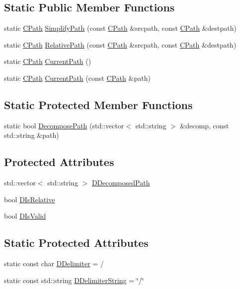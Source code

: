 \subsection*{Static Public Member Functions}
\begin{DoxyCompactItemize}
\item 
static \hyperlink{classCPath}{C\+Path} \hyperlink{classCPath_af0213a2ea0de0498ded236137e759922}{Simplify\+Path} (const \hyperlink{classCPath}{C\+Path} \&srcpath, const \hyperlink{classCPath}{C\+Path} \&destpath)
\item 
static \hyperlink{classCPath}{C\+Path} \hyperlink{classCPath_a76f73670ecc0a434c2f8a1ea0f1a040e}{Relative\+Path} (const \hyperlink{classCPath}{C\+Path} \&srcpath, const \hyperlink{classCPath}{C\+Path} \&destpath)
\item 
static \hyperlink{classCPath}{C\+Path} \hyperlink{classCPath_a5161b834e754b217ddead2437eaaa223}{Current\+Path} ()
\item 
static \hyperlink{classCPath}{C\+Path} \hyperlink{classCPath_a87ec01e5af0eb4e2184caf1d9ecc8892}{Current\+Path} (const \hyperlink{classCPath}{C\+Path} \&path)
\end{DoxyCompactItemize}
\subsection*{Static Protected Member Functions}
\begin{DoxyCompactItemize}
\item 
static bool \hyperlink{classCPath_aae05f3c3502e92bf68d5ce71264c7bb9}{Decompose\+Path} (std\+::vector$<$ std\+::string $>$ \&decomp, const std\+::string \&path)
\end{DoxyCompactItemize}
\subsection*{Protected Attributes}
\begin{DoxyCompactItemize}
\item 
std\+::vector$<$ std\+::string $>$ \hyperlink{classCPath_a03ed25209a01e633c107a0c877fc61f8}{D\+Decomposed\+Path}
\item 
bool \hyperlink{classCPath_af705ff149bb2281c67afb84fff550eb9}{D\+Is\+Relative}
\item 
bool \hyperlink{classCPath_a992aca27a1cba1c3bae3d04438821192}{D\+Is\+Valid}
\end{DoxyCompactItemize}
\subsection*{Static Protected Attributes}
\begin{DoxyCompactItemize}
\item 
static const char \hyperlink{classCPath_a4af2d74fc7695c4de8900dcc426530b5}{D\+Delimiter} = \textquotesingle{}/\textquotesingle{}
\item 
static const std\+::string \hyperlink{classCPath_a88b8652d01ff3359a48dd75126cc5776}{D\+Delimiter\+String} = \char`\"{}/\char`\"{}
\end{DoxyCompactItemize}


